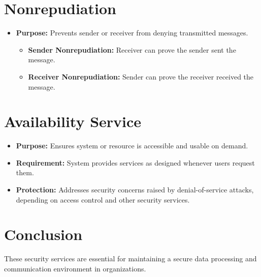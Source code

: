 \section{Nonrepudiation}
\begin{itemize}
    \item \textbf{Purpose:} Prevents sender or receiver from denying transmitted messages.\label{NonrepudiationPurpose}
    \begin{itemize}
        \item \textbf{Sender Nonrepudiation:} Receiver can prove the sender sent the message.\label{SenderNonrepudiation}
        \item \textbf{Receiver Nonrepudiation:} Sender can prove the receiver received the message.\label{ReceiverNonrepudiation}
    \end{itemize}
\end{itemize}

\section{Availability Service}
\begin{itemize}
    \item \textbf{Purpose:} Ensures system or resource is accessible and usable on demand.\label{AvailabilityPurpose}
    \item \textbf{Requirement:} System provides services as designed whenever users request them.\label{AvailabilityRequirement}
    \item \textbf{Protection:} Addresses security concerns raised by denial-of-service attacks, depending on access control and other security services.\label{DenialOfService}\label{AvailabilityProtection}
\end{itemize}

\section{Conclusion}
These security services are essential for maintaining a secure data processing and communication environment in organizations.
